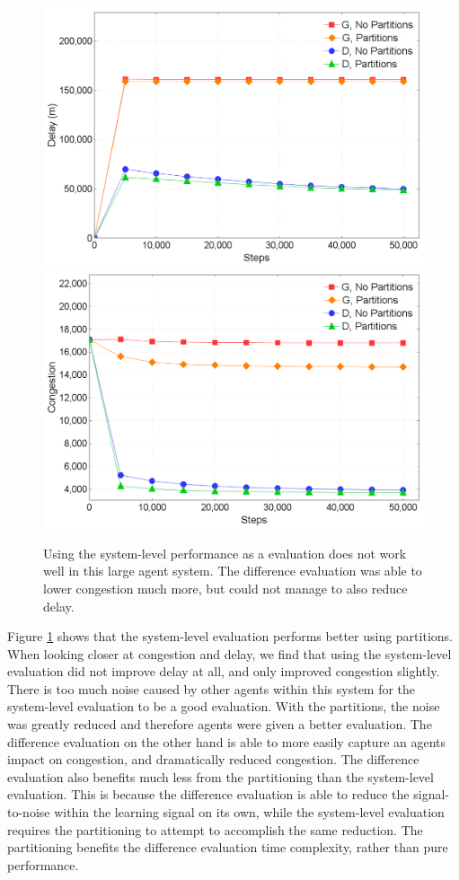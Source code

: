 \documentclass{sig-alternate}
\begin{document}
\begin{figure}[h!]
\centering
\includegraphics[width=1.0\columnwidth]{ClusterVsNoClusterNonGreedy-Delay}
\includegraphics[width=1.0\columnwidth]{ClusterVsNoClusterNonGreedy}
\caption{Using the system-level performance as a evaluation does not work well in this large agent system. The difference evaluation was able to lower congestion much more, but could not manage to also reduce delay.}
\label{NonClusterVsCluster}
\end{figure}

Figure \ref{NonClusterVsCluster} shows that the system-level evaluation performs better using partitions. When looking closer at congestion and delay, we find that using the system-level evaluation did not improve delay at all, and only improved congestion slightly. There is too much noise caused by other agents within this system for the system-level evaluation to be a good evaluation. With the partitions, the noise was greatly reduced and therefore agents were given a better evaluation. The difference evaluation on the other hand is able to more easily capture an agents impact on congestion, and dramatically reduced congestion. The difference evaluation also benefits much less from the partitioning than the system-level evaluation. This is because the difference evaluation is able to reduce the signal-to-noise within the learning signal on its own, while the system-level evaluation requires the partitioning to attempt to accomplish the same reduction. The partitioning benefits the difference evaluation time complexity, rather than pure performance.
\end{document}
